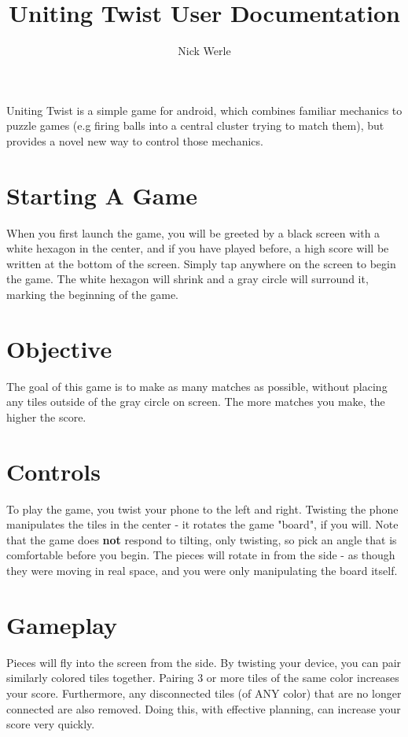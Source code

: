 \documentclass{article}
\title{Uniting Twist User Documentation}
\author{Nick Werle}
\begin{document}
\maketitle
Uniting Twist is a simple game for android, which combines familiar mechanics to puzzle games (e.g firing balls into a central cluster trying to match them), but provides a novel new way to control those mechanics.

\section{Starting A Game}
When you first launch the game, you will be greeted by a black screen with a white hexagon in the center, and if you have played before, a high score will be written at the bottom of the screen. Simply tap anywhere on the screen to begin the game. The white hexagon will shrink and a gray circle will surround it, marking the beginning of the game.

\section{Objective}
The goal of this game is to make as many matches as possible, without placing any tiles outside of the gray circle on screen. The more matches you make, the higher the score.

\section{Controls}
To play the game, you twist your phone to the left and right. Twisting the phone manipulates the tiles in the center - it rotates the game "board", if you will. Note that the game does \textbf{not} respond to tilting, only twisting, so pick an angle that is comfortable before you begin. The pieces will rotate in from the side - as though they were moving in real space, and you were only manipulating the board itself.

\section{Gameplay}
Pieces will fly into the screen from the side. By twisting your device, you can pair similarly colored tiles together. Pairing 3 or more tiles of the same color increases your score. Furthermore, any disconnected tiles (of ANY color) that are no longer connected are also removed. Doing this, with effective planning, can increase your score very quickly.
\end{document}
